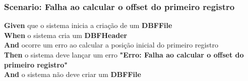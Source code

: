 \subsubsection{Scenario: Falha ao calcular o offset do primeiro registro}
\textbf{Given} que o sistema inicia a criação de um \textbf{DBFFile} \\
\textbf{When} o sistema cria um \textbf{DBFHeader} \\
\textbf{And} ocorre um erro ao calcular a posição inicial do primeiro registro \\
\textbf{Then} o sistema deve lançar um erro \textbf{"Erro: Falha ao calcular o offset do primeiro registro"} \\
\textbf{And} o sistema não deve criar um \textbf{DBFFile} \\

